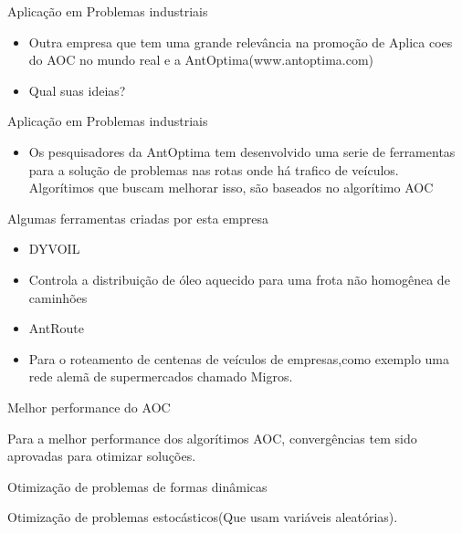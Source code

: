 \documentclass[compress]{beamer}
\begin{document}
\begin{frame}{Aplicação em Problemas industriais}
  \begin{itemize}
  \item {Outra empresa que tem uma grande relevância na promoção de Aplica coes do AOC no mundo real e a AntOptima(www.antoptima.com)}
  \newline
  \item{ Qual suas ideias? }
  \end{itemize}
\end{frame}

 \begin{frame}{Aplicação em Problemas industriais}
  \begin{itemize}
  \item {
Os pesquisadores da AntOptima tem desenvolvido uma serie de ferramentas para a solução de problemas nas rotas onde há trafico de veículos. Algorítimos que buscam melhorar isso, são baseados no algorítimo AOC
  }
  \end{itemize}
\end{frame}

\begin{frame}{Algumas ferramentas criadas por esta empresa}
  \begin{itemize}
  \item {DYVOIL}
  \newline
  \item{Controla a distribuição de óleo aquecido para uma frota não homogênea de caminhões}
  \newline
\item {AntRoute}
\newline
\item {Para o roteamento
de centenas de veículos de empresas,como exemplo uma rede alemã de supermercados chamado Migros.}
  \end{itemize}
\end{frame}

\begin{frame}{Melhor performance do AOC}
  \begin{itemize}
  \item {Para a melhor performance dos algorítimos AOC, convergências tem sido aprovadas para otimizar soluções.
  \newline
\item{Otimização de problemas de formas dinâmicas}
\newline
 \item{Otimização de problemas estocásticos(Que usam variáveis aleatórias).}
 }
  \end{itemize}
\end{frame}
\end{document}

